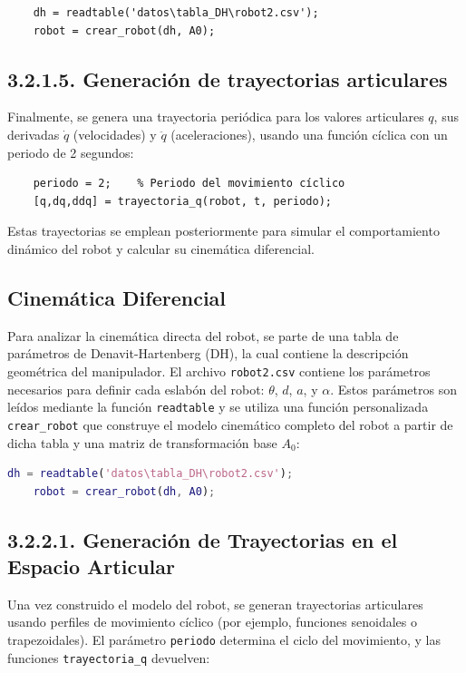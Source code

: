 \begin{verbatim}
	dh = readtable('datos\tabla_DH\robot2.csv');
	robot = crear_robot(dh, A0);
\end{verbatim}

\subsection*{3.2.1.5. Generación de trayectorias articulares}

Finalmente, se genera una trayectoria periódica para los valores articulares \( q \), sus derivadas \( \dot{q} \) (velocidades) y \( \ddot{q} \) (aceleraciones), usando una función cíclica con un periodo de 2 segundos:

\begin{verbatim}
	periodo = 2;    % Periodo del movimiento cíclico
	[q,dq,ddq] = trayectoria_q(robot, t, periodo);
\end{verbatim}

Estas trayectorias se emplean posteriormente para simular el comportamiento dinámico del robot y calcular su cinemática diferencial.


\subsection{Cinemática Diferencial}
Para analizar la cinemática directa del robot, se parte de una tabla de parámetros de Denavit-Hartenberg (DH), la cual contiene la descripción geométrica del manipulador. El archivo \texttt{robot2.csv} contiene los parámetros necesarios para definir cada eslabón del robot: $\theta$, $d$, $a$, y $\alpha$. Estos parámetros son leídos mediante la función \texttt{readtable} y se utiliza una función personalizada \texttt{crear\_robot} que construye el modelo cinemático completo del robot a partir de dicha tabla y una matriz de transformación base $A_0$:

\begin{lstlisting}[language=Matlab]
	dh = readtable('datos\tabla_DH\robot2.csv');
	robot = crear_robot(dh, A0);
\end{lstlisting}

\subsection*{3.2.2.1. Generación de Trayectorias en el Espacio Articular}
Una vez construido el modelo del robot, se generan trayectorias articulares usando perfiles de movimiento cíclico (por ejemplo, funciones senoidales o trapezoidales). El parámetro \texttt{periodo} determina el ciclo del movimiento, y las funciones \texttt{trayectoria\_q} devuelven:

